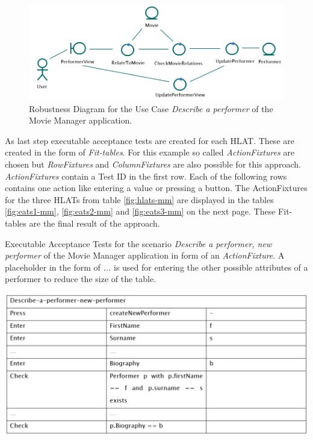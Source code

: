 \begin{figure}[h!]
	\centering
	\includegraphics[width=.8\textwidth]{../images/ElAttarRobustness.png}
	\caption{Robustness Diagram for the Use Case \textit{Describe a performer} of the Movie Manager application.}
	\label{fig:robustness-mm}
\end{figure}



As last step executable acceptance tests are created for each HLAT.
These are created in the form of \textit{Fit-tables}.
For this example so called \textit{ActionFixtures} are chosen but \textit{RowFixtures} and \textit{ColumnFixtures} are also possible for this approach.
\textit{ActionFixtures} contain a Test ID in the first row.
Each of the following rows contains one action like entering a value or pressing a button.
The ActionFixtures for the three HLATs from table \ref{fig:hlats-mm} are displayed in the tables \ref{fig:eats1-mm}, \ref{fig:eats2-mm} and \ref{fig:eats3-mm} on the next page.
These Fit-tables are the final result of the approach.

\begin{table}[H]
	\caption{Executable Acceptance Tests for the scenario \textit{Describe a performer, new performer} of the Movie Manager application in form of an \textit{ActionFixture}. 
	A placeholder in the form of \textit{...} is used for entering the other possible attributes of a performer to reduce the size of the table.}
	\centering
	\includegraphics[width=.9\textwidth]{../images/ElAttarEATs1.png}
	\label{fig:eats1-mm}
\end{table}

